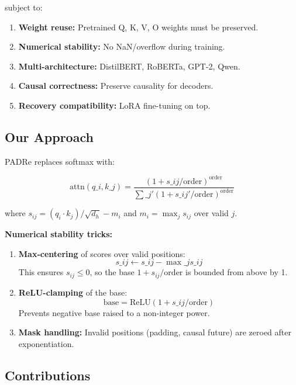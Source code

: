 subject to:

\begin{enumerate}
\item \textbf{Weight reuse:} Pretrained Q, K, V, O weights must be preserved.
\item \textbf{Numerical stability:} No NaN/overflow during training.
\item \textbf{Multi-architecture:} DistilBERT, RoBERTa, GPT-2, Qwen.
\item \textbf{Causal correctness:} Preserve causality for decoders.
\item \textbf{Recovery compatibility:} LoRA fine-tuning on top.

\end{enumerate}
\subsection{Our Approach}

PADRe replaces softmax with:

\[
\text{attn}(q\_i, k\_j) = \frac{(1 + s\_{ij}/\text{order})^\text{order}}{\sum\_{j'} (1 + s\_{ij'}/\text{order})^\text{order}}
\tag{1.4}
\]

where $s_{ij} = (q_i \cdot k_j)/\sqrt{d_h} - m_i$ and $m_i = \max_j s_{ij}$ over valid $j$.

\textbf{Numerical stability tricks:}

\begin{enumerate}
\item \textbf{Max-centering} of scores over valid positions:
  $$
  s\_{ij} \leftarrow s\_{ij} - \max\_j s\_{ij}
  \tag{1.5}
  $$
  This ensures $s_{ij} \leq 0$, so the base $1 + s_{ij}/\text{order}$ is
  bounded from above by 1.

\item \textbf{ReLU-clamping} of the base:
  $$
  \text{base} = \text{ReLU}(1 + s\_{ij}/\text{order})
  \tag{1.6}
  $$
  Prevents negative base raised to a non-integer power.

\item \textbf{Mask handling:} Invalid positions (padding, causal future) are zeroed
  after exponentiation.

\end{enumerate}
\subsection{Contributions}

